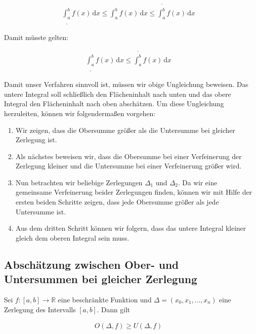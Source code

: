 \documentclass[fontsize=9pt,
               parskip=half-,
               DIV=14,
               listof=chapterentry,
               tocflat]{scrbook}
\begin{document}
\begin{align*}
{\underline {\int _{a}^{b}}}f(x)\,\mathrm {d} x\leq \int _{a}^{b}f(x)\,\mathrm {d} x\leq {\overline {\int _{a}^{b}}}f(x)\,\mathrm {d} x
\end{align*}

Damit müsste gelten:

\begin{align*}
{\underline {\int _{a}^{b}}}f(x)\,\mathrm {d} x\leq {\overline {\int _{a}^{b}}}f(x)\,\mathrm {d} x
\end{align*}

Damit unser Verfahren sinnvoll ist, müssen wir obige Ungleichung beweisen. Das untere Integral soll schließlich den Flächeninhalt nach unten und das obere Integral den Flächeninhalt nach oben abschätzen. Um diese Ungleichung herzuleiten, können wir folgendermaßen vorgehen:

\begin{enumerate}
\item Wir zeigen, dass die Obersumme größer als die Untersumme bei gleicher Zerlegung ist.
\item Als nächstes beweisen wir, dass die Obersumme bei einer Verfeinerung der Zerlegung kleiner und die Untersumme bei einer Verfeinerung größer wird.
\item Nun betrachten wir beliebige Zerlegungen $\Delta _{1}$ und $\Delta _{2}$. Da wir eine gemeinsame Verfeinerung beider Zerlegungen finden, können wir mit Hilfe der ersten beiden Schritte zeigen, dass jede Obersumme größer als jede Untersumme ist.
\item Aus dem dritten Schritt können wir folgern, dass das untere Integral kleiner gleich dem oberen Integral sein muss.
\end{enumerate}

\subsection{Abschätzung zwischen Ober- und Untersummen bei gleicher Zerlegung}

\begin{theorem*}
Sei $f:[a,b]\to \mathbb {R} $ eine beschränkte Funktion und $\Delta =(x_{0},x_{1},\ldots ,x_{n})$ eine Zerlegung des Intervalls $[a,b]$. Dann gilt

\begin{align*}
O(\Delta ,f)\geq U(\Delta ,f)
\end{align*}

\end{theorem*}
\end{document}
